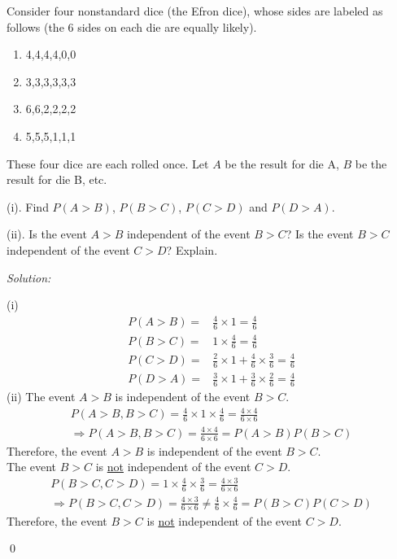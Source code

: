 \documentclass[12pt]{article}
\newenvironment{problem}[2][Problem]{\begin{trivlist}
\item[\hskip \labelsep {\bfseries #1}\hskip \labelsep {\bfseries #2.}]}{\end{trivlist}}
\newenvironment{sol}
    {\emph{Solution:}
    }
    {
    \qed
    }
\begin{document}
\begin{problem}{8}
Consider four nonstandard dice (the Efron dice), whose sides are labeled as follows (the 6 sides on each die
are equally likely).
\begin{enumerate}
    \item[A:] 4,4,4,4,0,0
    \item[B:] 3,3,3,3,3,3
    \item[C:] 6,6,2,2,2,2
    \item[D:] 5,5,5,1,1,1
\end{enumerate}
These four dice are each rolled once. Let $A$ be the result for die A, $B$ be the result for die B, etc.

(i). Find $P(A>B)$, $P(B>C)$, $P(C>D)$ and $P(D>A)$.

(ii). Is the event $A>B$ independent of the event $B>C$? Is the event $B>C$ independent of the event $C>D$? Explain.
\end{problem}
\begin{sol}
(i)
\begin{align*}
P(A>B)=&\frac{4}{6}\times1=\frac{4}{6}\\
P(B>C)=&1\times\frac{4}{6}=\frac{4}{6}\\
P(C>D)=&\frac{2}{6}\times1+\frac{4}{6}\times\frac{3}{6}=\frac{4}{6}\\
P(D>A)=&\frac{3}{6}\times1+\frac{3}{6}\times\frac{2}{6}=\frac{4}{6}
\end{align*}
(ii) The event $A>B$ is independent of the event $B>C$.
\begin{gather*}
P(A>B,B>C)=\frac{4}{6}\times1\times\frac{4}{6}=\frac{4\times4}{6\times6}\\
\Longrightarrow P(A>B,B>C)=\frac{4\times4}{6\times6}=P(A>B)P(B>C)
\end{gather*}
Therefore, the event $A>B$ is independent of the event $B>C$.\\
The event $B>C$ is \uline{not} independent of the event $C>D$.
\begin{gather*}
P(B>C,C>D)=1\times\frac{4}{6}\times\frac{3}{6}=\frac{4\times3}{6\times6}\\
\Longrightarrow P(B>C,C>D)=\frac{4\times3}{6\times6}\neq\frac{4}{6}\times\frac{4}{6}=P(B>C)P(C>D)
\end{gather*}
Therefore, the event $B>C$ is \uline{not} independent of the event $C>D$.
\end{sol}
\end{document}
